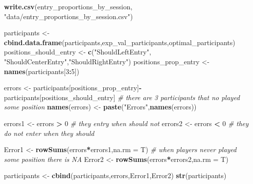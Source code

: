 \documentclass[]{article}
\newenvironment{Shaded}{\begin{snugshade}}{\end{snugshade}}
\newcommand{\KeywordTok}[1]{\textcolor[rgb]{0.13,0.29,0.53}{\textbf{#1}}}
\newcommand{\DataTypeTok}[1]{\textcolor[rgb]{0.13,0.29,0.53}{#1}}
\newcommand{\DecValTok}[1]{\textcolor[rgb]{0.00,0.00,0.81}{#1}}
\newcommand{\StringTok}[1]{\textcolor[rgb]{0.31,0.60,0.02}{#1}}
\newcommand{\CommentTok}[1]{\textcolor[rgb]{0.56,0.35,0.01}{\textit{#1}}}
\newcommand{\OperatorTok}[1]{\textcolor[rgb]{0.81,0.36,0.00}{\textbf{#1}}}
\newcommand{\NormalTok}[1]{#1}
\begin{document}
\begin{Shaded}
\begin{Highlighting}[]
\KeywordTok{write.csv}\NormalTok{(entry_proportions_by_session, }\StringTok{"data/entry_proportions_by_session.csv"}\NormalTok{)}

\NormalTok{participants <-}\StringTok{ }\KeywordTok{cbind.data.frame}\NormalTok{(participants,exp_val_participants,optimal_participants) }
\NormalTok{positions_should_entry <-}\StringTok{ }\KeywordTok{c}\NormalTok{(}\StringTok{"ShouldLeftEntry"}\NormalTok{, }\StringTok{"ShouldCenterEntry"}\NormalTok{,}\StringTok{"ShouldRightEntry"}\NormalTok{)}
\NormalTok{positions_prop_entry <-}\StringTok{ }\KeywordTok{names}\NormalTok{(participants[}\DecValTok{3}\OperatorTok{:}\DecValTok{5}\NormalTok{])}

\NormalTok{errors <-}\StringTok{  }\NormalTok{participants[positions_prop_entry]}\OperatorTok{-}
\StringTok{  }\NormalTok{participants[positions_should_entry] }\CommentTok{# there are 3 participants that no played some position}
\KeywordTok{names}\NormalTok{(errors) <-}\StringTok{ }\KeywordTok{paste}\NormalTok{(}\StringTok{"Errors"}\NormalTok{,}\KeywordTok{names}\NormalTok{(errors))}

\NormalTok{errors1 <-}\StringTok{ }\NormalTok{errors }\OperatorTok{>}\StringTok{ }\DecValTok{0} \CommentTok{# they entry when should not}
\NormalTok{errors2 <-}\StringTok{ }\NormalTok{errors }\OperatorTok{<}\StringTok{ }\DecValTok{0} \CommentTok{# they do not enter when they should }

\NormalTok{Error1 <-}\StringTok{ }\KeywordTok{rowSums}\NormalTok{(errors}\OperatorTok{*}\NormalTok{errors1,}\DataTypeTok{na.rm =}\NormalTok{ T) }\CommentTok{# when players never played some position there is NA}
\NormalTok{Error2 <-}\StringTok{ }\KeywordTok{rowSums}\NormalTok{(errors}\OperatorTok{*}\NormalTok{errors2,}\DataTypeTok{na.rm =}\NormalTok{ T)}

\NormalTok{participants <-}\StringTok{ }\KeywordTok{cbind}\NormalTok{(participants,errors,Error1,Error2)}
\KeywordTok{str}\NormalTok{(participants)}
\end{Highlighting}
\end{Shaded}
\end{document}
